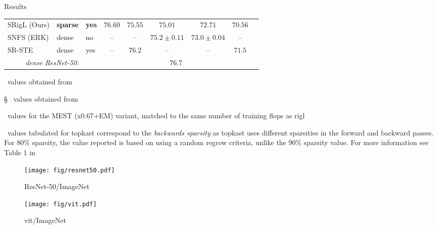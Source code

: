 \documentclass[final]{beamer}
\newlength{\colwidth}
\begin{document}
\begin{frame}[t]
\begin{columns}[t]
\begin{column}{\colwidth}
\begin{block}{Results}
\begin{table}[p]
\begin{threeparttable}
\begin{center}
\begin{tabular}{@{}p{6.0em}p{4.0em}p{5.5em}cccccc@{}}
        SRigL (Ours) & \textbf{sparse} & \textbf{yes} & $\mathbf{76.60}$ & $\mathbf{75.55}$ & $75.01$ & $72.71$ & $70.56$ \\ 
        \cmidrule{1-8}
        SNFS (ERK)\tnote{\textasteriskcentered} & dense & no & -- & -- & $75.2\pm 0.11$ & $73.0\pm 0.04$ & -- \\ 
        SR-STE & dense & yes & -- & $76.2$ & -- & -- & $71.5$ \\ 
        \cmidrule{1-8}
        \multicolumn{3}{c}{\emph{dense ResNet-50:}} & \multicolumn{5}{c}{$76.7$} \\\bottomrule
    \end{tabular}
    \begin{tablenotes}
    \footnotesize
    \item[\textasteriskcentered]~values obtained from \citet{evci_rigging_2021}
    \item[\S]~values obtained from \citet{mostafa_parameter_2019}
    \item[\textdagger]~values for the MEST (x0.67+EM) variant, matched to the same number of training \gls{flops} as \gls{rigl}
    \item[\textdaggerdbl]~values tabulated for \gls{topkast} correspond to the \emph{backwards sparsity} as \gls{topkast} uses different sparsities in the forward and backward passes. For 80\% sparsity, the value reported is based on using a random regrow criteria, unlike the 90\% sparsity value. For more information see Table 1 in \citep{jayakumar_top-kast_2020}
    \end{tablenotes}
    \end{center}
    \end{threeparttable}
  \end{table}


\begin{figure}
    \begin{minipage}{.49\colwidth}
        \centering
        \texttt{[image: fig/resnet50.pdf]}
        \caption{ResNet-50/ImageNet}\label{fig:resnet50_acc_vs_sparsity}
    \end{minipage}
    \hfill
    \begin{minipage}{.49\colwidth}
        \centering
        \texttt{[image: fig/vit.pdf]}
        \caption{\gls{vit}/ImageNet}\label{fig:vit}
    \end{minipage}
\end{figure}

\end{block}


\end{column}
\end{columns}
\end{frame}
\end{document}
